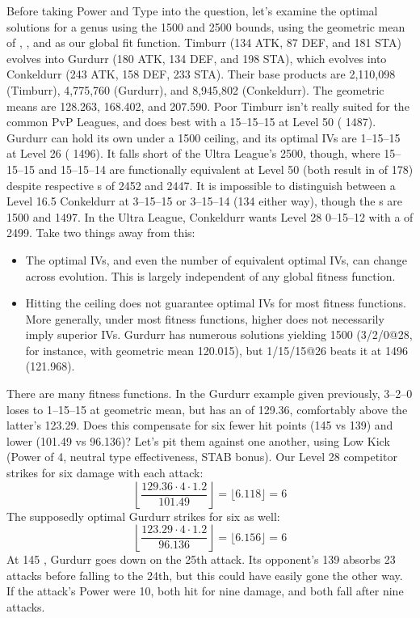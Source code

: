 Before taking Power and Type into the question, let's examine the optimal
 solutions for a genus using the 1500 and 2500 \CP{} bounds, using the
 geometric mean of , , and \MHP{} as our global fit function.
Timburr (134 ATK, 87 DEF, and 181 STA) evolves into
  Gurdurr (180 ATK, 134 DEF, and 198 STA), which evolves into
  Conkeldurr (243 ATK, 158 DEF, 233 STA).
Their base products are 2,110,098 (Timburr), 4,775,760 (Gurdurr),
  and 8,945,802 (Conkeldurr).
The geometric means are 128.263, 168.402, and 207.590.
Poor Timburr isn't really suited for the common PvP Leagues,
  and does best with a 15--15--15 at Level 50 (\CP{} 1487).
Gurdurr can hold its own under a 1500 \CP{} ceiling, and its
  optimal IVs are 1--15--15 at Level 26 (\CP{} 1496).
It falls short of the Ultra League's 2500, though, where
  15--15--15 and 15--15--14 are functionally equivalent
  at Level 50 (both result in \MHP{} of 178) despite
  respective \CP{}s of 2452 and 2447.
It is impossible to distinguish between a Level 16.5 Conkeldurr at
  3--15--15 or 3--15--14 (134 \MHP{} either way), though
  the \CP{}s are 1500 and 1497.
In the Ultra League, Conkeldurr wants Level 28 0--15--12 with
  a \CP{} of 2499.
Take two things away from this:
\begin{itemize}
\item The optimal IVs, and even the number of equivalent optimal IVs, can change across evolution.
  This is largely independent of any global fitness function.
\item Hitting the ceiling does not guarantee optimal IVs for most fitness functions.
  More generally, under most fitness functions, higher \CP{} does not necessarily imply superior IVs.
    Gurdurr has numerous solutions yielding 1500 \CP{} (3/2/0@28, for instance, with geometric
    mean 120.015), but 1/15/15@26 beats it at 1496 (121.968).
\end{itemize}
There are many fitness functions. In the Gurdurr example given previously, 3--2--0 loses
    to 1--15--15 at geometric mean, but has an  of 129.36, comfortably above the latter's 123.29.
 Does this compensate for six fewer hit points (145 vs 139) and lower  (101.49 vs 96.136)?
 Let's pit them against one another, using Low Kick (Power of 4, neutral type effectiveness, STAB bonus).
 Our Level 28 competitor strikes for six damage with each attack:
    \[ \left\lfloor \frac{129.36 \cdot 4 \cdot 1.2}{101.49} \right\rfloor = \lfloor 6.118 \rfloor = 6 \]
 The supposedly optimal Gurdurr strikes for six as well:
    \[ \left\lfloor \frac{123.29 \cdot 4 \cdot 1.2}{96.136} \right\rfloor = \lfloor 6.156 \rfloor = 6 \]
 At 145 \HP, Gurdurr goes down on the 25th attack.
 Its opponent's 139 \HP{} absorbs 23 attacks before falling to the 24th, but this could
    have easily gone the other way.
 If the attack's Power were 10, both hit for nine damage, and both fall after nine attacks.

